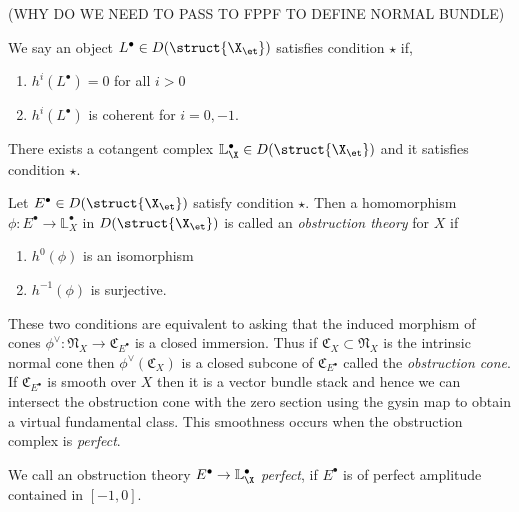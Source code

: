 \documentclass[12pt]{article}
\newcommand{\LL}{\mathbb{L}}
\begin{document}
(WHY DO WE NEED TO PASS TO FPPF TO DEFINE NORMAL BUNDLE)

\begin{defn}
We say an object $L^\bullet \in D(\struct{\X_{\et}})$ satisfies condition $\star$ if,
\begin{enumerate}
\item $h^i(L^\bullet) = 0$ for all $i > 0$
\item $h^i(L^\bullet)$ is coherent for $i = 0,-1$.
\end{enumerate}
\end{defn}

\begin{prop}
There exists a cotangent complex $\LL_{\X}^\bullet \in D(\struct{\X_{\et}})$ and it satisfies condition $\star$.
\end{prop}

\begin{defn}
Let $E^\bullet \in D(\struct{\X_{\et}})$ satisfy condition $\star$. Then a homomorphism $\phi : E^\bullet \to \LL_X^\bullet$ in $D(\struct{\X_{\et}})$ is called an \textit{obstruction theory} for $X$ if
\begin{enumerate}
\item $h^0(\phi)$ is an isomorphism
\item $h^{-1}(\phi)$ is surjective.
\end{enumerate}
\end{defn}

\begin{rmk}
These two conditions are equivalent to asking that the induced morphism of cones $\phi^\vee : \mathfrak{N}_X \to \mathfrak{C}_{E^\bullet}$ is a closed immersion. Thus if $\mathfrak{C}_X \subset \mathfrak{N}_X$ is the intrinsic normal cone then $\phi^\vee(\mathfrak{C}_X)$ is a closed subcone of $\mathfrak{C}_{E^\bullet}$ called the \textit{obstruction cone}. If $\mathfrak{C}_{E^\bullet}$ is smooth over $X$ then it is a vector bundle stack and hence we can intersect the obstruction cone with the zero section using the gysin map to obtain a virtual fundamental class. This smoothness occurs when the obstruction complex is \textit{perfect}. 
\end{rmk}

\begin{defn}
We call an obstruction theory $E^\bullet \to \LL^\bullet_{\X}$ \textit{perfect}, if $E^\bullet$ is of perfect amplitude contained in $[-1,0]$.
\end{defn}

\newcommand{\fC}{\mathfrak{C}}
\end{document}
